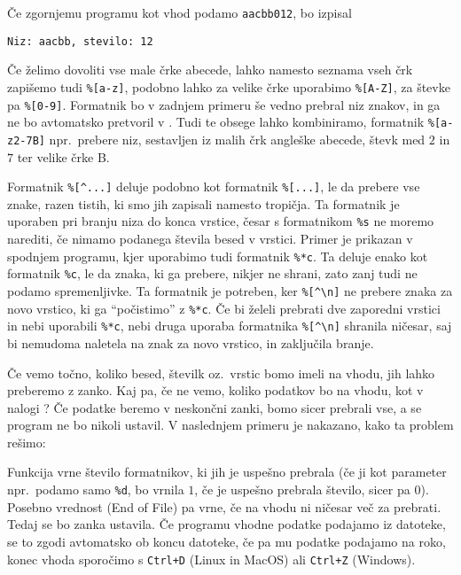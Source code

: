 
Če zgornjemu programu kot vhod podamo \texttt{aacbb012}, bo izpisal
\begin{verbatim}
Niz: aacbb, stevilo: 12
\end{verbatim}
Če želimo dovoliti vse male črke abecede, lahko namesto seznama vseh črk
zapišemo tudi \verb+%[a-z]+, podobno lahko za velike črke uporabimo
\verb+%[A-Z]+, za števke pa \verb+%[0-9]+.
Formatnik bo v zadnjem primeru še vedno prebral niz znakov, in ga ne bo
avtomatsko pretvoril v .
Tudi te obsege lahko kombiniramo, formatnik \verb+%[a-z2-7B]+ npr.~prebere niz,
sestavljen iz malih črk angleške abecede, števk med $2$ in $7$ ter velike črke
B.

Formatnik \verb+%[^...]+ deluje podobno kot formatnik \verb+%[...]+, le da
prebere vse znake, razen tistih, ki smo jih zapisali namesto tropičja.
Ta formatnik je uporaben pri branju niza do konca vrstice, česar s formatnikom
\verb+%s+ ne moremo narediti, če nimamo podanega števila besed v vrstici.
Primer je prikazan v spodnjem programu, kjer uporabimo tudi formatnik
\verb+%*c+.
Ta deluje enako kot formatnik \verb+%c+, le da znaka, ki ga prebere, nikjer ne
shrani, zato zanj tudi ne podamo spremenljivke.
Ta formatnik je potreben, ker \verb+%[^\n]+ ne prebere znaka za novo vrstico, ki
ga \enquote{počistimo} z \verb+%*c+.
Če bi želeli prebrati dve zaporedni vrstici in nebi uporabili \verb+%*c+, nebi
druga uporaba formatnika \verb+%[^\n]+ shranila ničesar, saj bi nemudoma
naletela na znak za novo vrstico, in zaključila branje.



Če vemo točno, koliko besed, številk oz.~vrstic bomo imeli na vhodu, jih lahko
preberemo z zanko.
Kaj pa, če ne vemo, koliko podatkov bo na vhodu, kot v nalogi
?
Če podatke beremo v neskončni zanki, bomo sicer prebrali vse, a se program ne
bo nikoli ustavil.
V naslednjem primeru je nakazano, kako ta problem rešimo:


Funkcija  vrne število formatnikov, ki jih je uspešno prebrala (če
ji kot parameter npr.~podamo samo \verb+%d+, bo vrnila $1$, če je uspešno
prebrala število, sicer pa $0$).
Posebno vrednost  (End of File) pa vrne, če na vhodu ni ničesar več za
prebrati.
Tedaj se bo zanka ustavila.
Če programu vhodne podatke podajamo iz datoteke, se to zgodi avtomatsko ob koncu
datoteke, če pa mu podatke podajamo na roko, konec vhoda sporočimo s
\verb|Ctrl+D| (Linux in MacOS) ali \verb|Ctrl+Z| (Windows).

